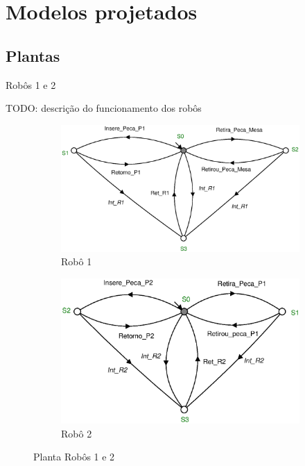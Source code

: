 \section{Modelos projetados}
\subsection{Plantas}
Robôs 1 e 2

TODO: descrição do funcionamento dos robôs

\begin{figure}[H]%
  \centering
  \begin{subfigure}[b]{0.45\textwidth}
      \centering
      \includegraphics[width=\textwidth]{imagens/Robo_1.eps}
      \caption{Robô 1}
      \label{fig:r1}
  \end{subfigure}
  \hfill
  \begin{subfigure}[b]{0.45\textwidth}
      \centering
      \includegraphics[width=\textwidth]{imagens/Robo_2.eps}
      \caption{Robô 2}
      \label{fig:r2}
  \end{subfigure}
  \caption{Planta Robôs 1 e 2}
  \label{fig:robo12}
\end{figure}


